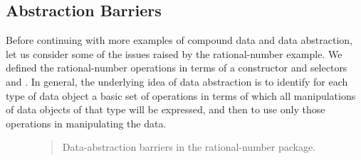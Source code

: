 \subsection{Abstraction Barriers}
\label{Section 2.1.2}

Before continuing with more examples of compound data and data abstraction, let
us consider some of the issues raised by the rational-number example.  We
defined the rational-number operations in terms of a constructor
 and selectors  and .  In general, the
underlying idea of data abstraction is to identify for each type of data object
a basic set of operations in terms of which all manipulations of data objects
of that type will be expressed, and then to use only those operations in
manipulating the data.

\begin{figure}[tb]
\label{Figure 2.1}
\centering
\begin{comment}
\begin{quote}
\heading{Figure 2.1:} Data-abstraction barriers in the rational-number package.

\begin{example}
        +------------------------------------+
--------| Programs that use rational numbers |--------
        +------------------------------------+
          Rational numbers in problem domain
            +---------------------------+
------------|   add-rat  sub-rat  ...   |-------------
            +---------------------------+
   Rational numbers as numerators and denominators
              +------------------------+
--------------| make-rat  numer  denom |--------------
              +------------------------+
              Rational numbers as pairs
                  +----------------+
------------------| cons  car  cdr |------------------
                  +----------------+
            However pairs are implemented
\end{example}
\end{quote}
\end{comment}

\begin{quote}
 Data-abstraction barriers in the rational-number package.
\end{quote}
\end{figure}

